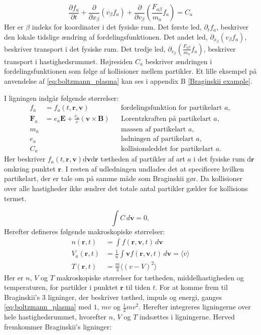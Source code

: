 \begin{equation}
    \frac{\partial f_a}{\partial t} + \frac{\partial}{\partial x_\beta} \left(v_\beta f_a\right) +
    \frac{\partial}{\partial v_\beta} \left(\frac{F_{a\beta}}{m_a} f_a\right) = C_a
    \label{eq:boltzmann_plasma}
\end{equation}
Her er $\beta$ indeks for koordinater i det fysiske rum. Det første led, $\partial_t f_a$, beskriver den lokale tidslige ændring af fordelingsfunktionen.
Det andet led, $\partial_{x_\beta}(v_\beta f_a)$, beskriver transport i det fysiske rum.
Det tredje led, $\partial_{v_\beta}\left( \frac{F_{a\beta}}{m_a} f_a \right)$, beskriver transport i hastighedsrummet.
Højresiden $C_a$ beskriver ændringen i fordelingsfunktionen som følge af kollisioner mellem partikler.
Et lille eksempel på anvendelse af \eqref{eq:boltzmann_plasma} kan ses i appendix B \ref{Braginskii example}.


I ligningen indgår følgende størrelser:
\begin{align*}
    f_a &= f_a(t,\mathbf{r},\mathbf{v}) &&\text{fordelingsfunktion for partikelart $a$}, \\
    \mathbf{F}_a &= e_a\mathbf{E} + \frac{e_a}{c}\left(\mathbf{v}\times\mathbf{B}\right) &&\text{Lorentzkraften på partikelart $a$}, \\
    m_a &&&\text{massen af partikelart $a$}, \\
    e_a &&&\text{ladningen af partikelart $a$}, \\
    C_a &&&\text{kollisionsleddet for partikelart $a$}.
\end{align*}
Her beskriver $f_a(t,\mathbf{r},\mathbf{v})\mathrm{d}\mathbf{v}\mathrm{d}\mathbf{r}$ tætheden af partikler af art $a$ i det fysiske rum $\mathrm{d}\mathbf{r}$ omkring punktet $\mathbf{r}$.
I resten af udledningen undlades det at specificere hvilken partikelart, der er tale om på samme måde som Braginskii gør. 
Da kollisioner over alle hastigheder ikke ændrer det totale antal partikler gælder for kollisions termet.

\begin{equation*}
    \int C\,d\mathbf{v} = 0, 
\end{equation*}
Herefter defineres følgende makroskopiske størrelser:
\begin{align*}
    n(\mathbf{r},t) &= \int f(\mathbf{r},\mathbf{v},t)\,d\mathbf{v}\\
    V_{a}(\mathbf{r},t) &= \frac{1}{n} \int \mathbf{v} f(\mathbf{r},\mathbf{v},t)\,d\mathbf{v} = \langle v \rangle\\
    T(\mathbf{r},t) &= \frac{m}{3}\langle (v - V)^2 \rangle
\end{align*}
Her er $n$, $V$ og $T$ makroskopiske størrelser for tætheden, middelhastigheden og temperaturen, for partikler i punktet $\mathbf{r}$ til tiden $t$.
For at komme frem til Braginskii's 3 ligninger, der beskriver tæthed, impuls og energi, ganges \eqref{eq:boltzmann_plasma} med $1$, $m v$ og $\frac{1}{2} m v^2$.
Herefter integreres ligningerne over hele hastighedsrummet, hvorefter $n$, $V$ og $T$ indsættes i ligningerne. Herved fremkommer Braginskii's ligninger:

